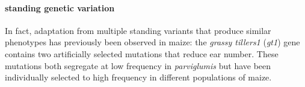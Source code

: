 \paragraph{standing genetic variation}
In fact, adaptation from multiple standing variants that produce similar phenotypes has previously been observed in maize: the \emph{grassy tillers1} (\emph{gt1}) gene \cite[]{Wills_2013_23825971} contains two artificially selected mutations that reduce ear number.
These mutations both segregate at low frequency in \emph{parviglumis} but have been individually selected to high frequency in different populations of maize.





